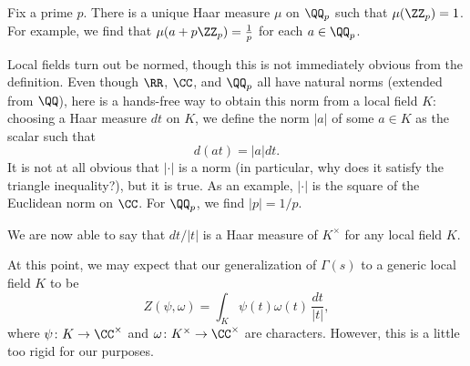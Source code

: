 \documentclass{article}
\begin{document}
\begin{example}
	Fix a prime $p$. There is a unique Haar measure $\mu$ on $\QQ_p$ such that $\mu(\ZZ_p)=1$. For example, we find that $\mu(a+p\ZZ_p)=\frac1p$ for each $a\in\QQ_p$.
\end{example}
\begin{remark}
	Local fields turn out be normed, though this is not immediately obvious from the definition. Even though $\RR$, $\CC$, and $\QQ_p$ all have natural norms (extended from $\QQ$), here is a hands-free way to obtain this norm from a local field $K$: choosing a Haar measure $dt$ on $K$, we define the norm $\left|a\right|$ of some $a\in K$ as the scalar such that
	\[d(at)=\left|a\right|dt.\]
	It is not at all obvious that $\left|\cdot\right|$ is a norm (in particular, why does it satisfy the triangle inequality?), but it is true. As an example, $\left|\cdot\right|$ is the square of the Euclidean norm on $\CC$. For $\QQ_p$, we find $\left|p\right|=1/p$.
\end{remark}
\begin{example}
	We are now able to say that $dt/\left|t\right|$ is a Haar measure of $K^\times$ for any local field $K$.
\end{example}
At this point, we may expect that our generalization of $\Gamma(s)$ to a generic local field $K$ to be
\[Z(\psi,\omega)=\int_K\psi(t)\omega(t)\,\frac{dt}{\left|t\right|},\]
where $\psi\colon K\to\CC^\times$ and $\omega\colon K^\times\to\CC^\times$ are characters. However, this is a little too rigid for our purposes.
\end{document}
